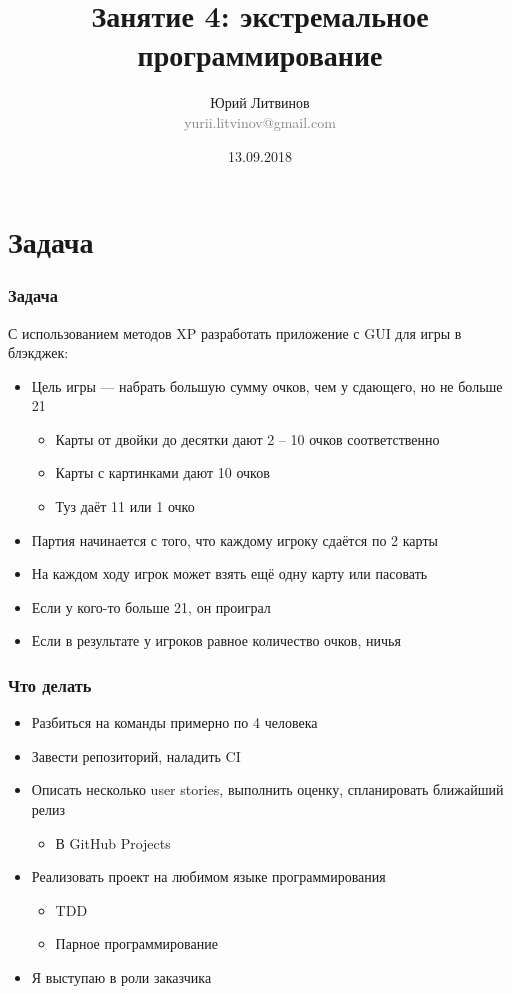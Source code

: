 \documentclass[xetex,mathserif,serif]{beamer}
\title{Занятие 4: экстремальное программирование}
\author[Юрий Литвинов]{Юрий Литвинов\\\small{\textcolor{gray}{yurii.litvinov@gmail.com}}}
\date{13.09.2018}
\begin{document}
	\frame{\titlepage}

	\section{Задача}

	\begin{frame}
		\frametitle{Задача}
		С использованием методов XP разработать приложение с GUI для игры в блэкджек:
		\begin{itemize}
			\item Цель игры --- набрать большую сумму очков, чем у сдающего, но не больше 21
			\begin{itemize}
				\item Карты от двойки до десятки дают 2 -- 10 очков соответственно
				\item Карты с картинками дают 10 очков
				\item Туз даёт 11 или 1 очко
			\end{itemize}
			\item Партия начинается с того, что каждому игроку сдаётся по 2 карты
			\item На каждом ходу игрок может взять ещё одну карту или пасовать
			\item Если у кого-то больше 21, он проиграл
			\item Если в результате у игроков равное количество очков, ничья
		\end{itemize}
	\end{frame}

	\begin{frame}
		\frametitle{Что делать}
		\begin{itemize}
			\item Разбиться на команды примерно по 4 человека
			\item Завести репозиторий, наладить CI
			\item Описать несколько user stories, выполнить оценку, спланировать ближайший релиз
			\begin{itemize}
				\item В GitHub Projects
			\end{itemize}
			\item Реализовать проект на любимом языке программирования
			\begin{itemize}
				\item TDD
				\item Парное программирование
			\end{itemize}
			\item Я выступаю в роли заказчика
		\end{itemize}
	\end{frame}
\end{document}
